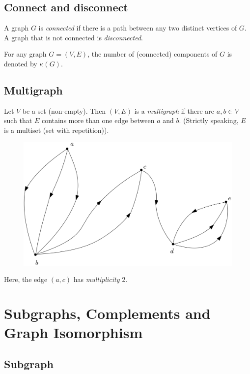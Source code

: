 \documentclass[11pt]{article}
\begin{document}
    \subsection{Connect and disconnect}

    A graph $G$ is \emph{connected} if there is a path between any two distinct vertices of $G$. A graph that is not connected is \emph{disconnected}. 

    \vspace{1em}

    For any graph \(G = (V,E)\), the number of (connected) components of $G$ is denoted by \(\kappa (G)\). 

    \subsection{Multigraph}

    Let $V$ be a set (non-empty). Then \((V,E)\) is a \emph{multigraph} if there are \(a,b \in V\) such that $E$ contains more than one edge between $a$ and $b$. (Strictly speaking, $E$ is a multiset (set with repetition)). 

    \begin{figure}[H]
        \centering
        \includegraphics[scale=0.2]{multigraph.png}
    \end{figure}
    Here, the edge \((a,c)\) has \emph{multiplicity} 2.

    \section{Subgraphs, Complements and Graph Isomorphism}

    \subsection{Subgraph}
\end{document}
